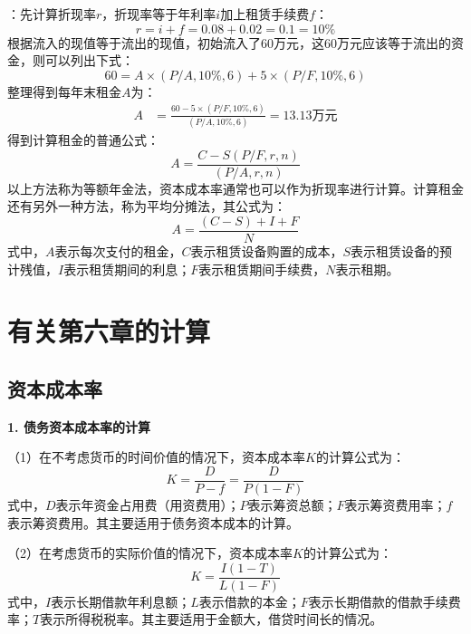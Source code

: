 \documentclass[
  10pt,
  twoside,
  openany,
  b5paper, %
  colorscheme = black, %
  xits = false,
]{qyxf-book}
\begin{document}
\solve[答]：先计算折现率$r$，折现率等于年利率$i$加上租赁手续费$f$：
\begin{equation*}
	r = i + f = 0.08 + 0.02 = 0.1 = 10\%
\end{equation*}
根据流入的现值等于流出的现值，初始流入了60万元，这60万元应该等于流出的资金，则可以列出下式：
\begin{equation*}
	60 = A \times (P/A, 10\%, 6) + 5 \times (P/F, 10\%, 6) 
\end{equation*}
整理得到每年末租金$A$为：
\begin{equation*}
	\begin{aligned}
		A &= \frac{60 - 5 \times(P/F, 10\%, 6)}{(P/A, 10\%, 6)} = 13.13 \text{万元} 
	\end{aligned}
\end{equation*}
得到计算租金的普通公式：
\begin{equation*}
	A = \frac{C-S(P/F,r,n)}{(P/A,r,n)}
\end{equation*}
以上方法称为等额年金法，资本成本率通常也可以作为折现率进行计算。计算租金还有另外一种方法，称为平均分摊法，其公式为：
\begin{equation*}
	A = \frac{(C-S)+I+F}{N} 
\end{equation*}
式中，$A$表示每次支付的租金，$C$表示租赁设备购置的成本，$S$表示租赁设备的预计残值，$I$表示租赁期间的利息；$F$表示租赁期间手续费，$N$表示租期。

\newpage

\section{有关第六章的计算}
\subsection{资本成本率}

\textbf{1. 债务资本成本率的计算}

（1）在不考虑货币的时间价值的情况下，资本成本率$K$的计算公式为：
\begin{equation*}
	K = \frac{D}{P-f} = \frac{D}{P(1-F)}
\end{equation*}
式中，$D$表示年资金占用费（用资费用）；$P$表示筹资总额；$F$表示筹资费用率；$f$表示筹资费用。其主要适用于债务资本成本的计算。

（2）在考虑货币的实际价值的情况下，资本成本率$K$的计算公式为：
\begin{equation*}
	K = \frac{I(1-T)}{L(1-F)}
\end{equation*}
式中，$I$表示长期借款年利息额；$L$表示借款的本金；$F$表示长期借款的借款手续费率；$T$表示所得税税率。其主要适用于金额大，借贷时间长的情况。
\end{document}
